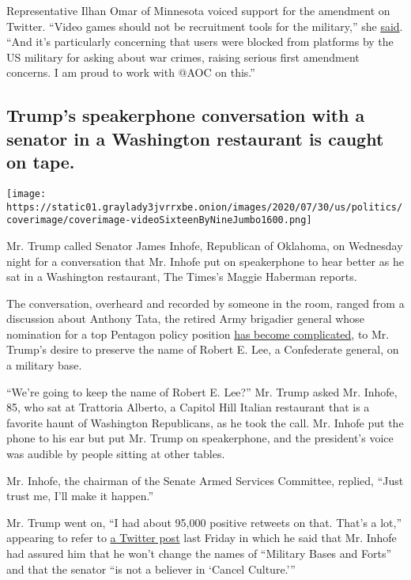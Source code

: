 Representative Ilhan Omar of Minnesota voiced support for the amendment
on Twitter. ``Video games should not be recruitment tools for the
military,'' she
\href{https://twitter.com/IlhanMN/status/1288882866538131459}{said}.
``And it's particularly concerning that users were blocked from
platforms by the US military for asking about war crimes, raising
serious first amendment concerns. I am proud to work with @AOC on
this.''

\hypertarget{trumps-speakerphone-conversation-with-a-senator-in-a-washington-restaurant-is-caught-on-tape}{%
\subsection{Trump's speakerphone conversation with a senator in a
Washington restaurant is caught on
tape.}\label{trumps-speakerphone-conversation-with-a-senator-in-a-washington-restaurant-is-caught-on-tape}}

\texttt{[image: https://static01.graylady3jvrrxbe.onion/images/2020/07/30/us/politics/coverimage/coverimage-videoSixteenByNineJumbo1600.png]}

Mr. Trump called Senator James Inhofe, Republican of Oklahoma, on
Wednesday night for a conversation that Mr. Inhofe put on speakerphone
to hear better as he sat in a Washington restaurant, The Times's Maggie
Haberman reports.

The conversation, overheard and recorded by someone in the room, ranged
from a discussion about Anthony Tata, the retired Army brigadier general
whose nomination for a top Pentagon policy position
\href{https://www.nytimes3xbfgragh.onion/2020/07/30/us/politics/trump-inhofe-tata-pentagon.html}{has
become complicated}, to Mr. Trump's desire to preserve the name of
Robert E. Lee, a Confederate general, on a military base.

``We're going to keep the name of Robert E. Lee?'' Mr. Trump asked Mr.
Inhofe, 85, who sat at Trattoria Alberto, a Capitol Hill Italian
restaurant that is a favorite haunt of Washington Republicans, as he
took the call. Mr. Inhofe put the phone to his ear but put Mr. Trump on
speakerphone, and the president's voice was audible by people sitting at
other tables.

Mr. Inhofe, the chairman of the Senate Armed Services Committee,
replied, ``Just trust me, I'll make it happen.''

Mr. Trump went on, ``I had about 95,000 positive retweets on that.
That's a lot,'' appearing to refer to
\href{https://twitter.com/realDonaldTrump/status/1286669631072108546}{a
Twitter post} last Friday in which he said that Mr. Inhofe had assured
him that he won't change the names of ``Military Bases and Forts'' and
that the senator ``is not a believer in `Cancel Culture.'''


